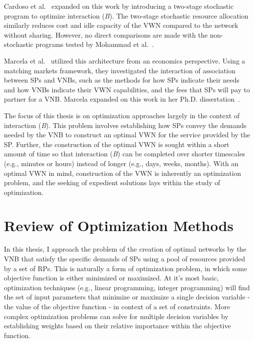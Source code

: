 \documentclass[12pt,dvipsnames]{report}
\begin{document}
Cardoso et al.~\cite{MJ_MECOMM_17} expanded on this work by introducing a two-stage stochastic program to optimize interaction (\emph{B}).  The two-stage stochastic resource allocation similarly reduces cost and idle capacity of the VWN compared to the network without sharing.  However, no direct comparisons are made with the non-stochastic programs tested by Mohammad et al.~\cite{MJ_CCNC_16}.

Marcela et al.~\cite{pittir33631} utilized this architecture from an economics perspective.  Using a matching markets framework, they investigated the interaction of association between SPs and VNBs, such as the methods for how SPs indicate their needs and how VNBs indicate their VWN capabilities, and the fees that SPs will pay to partner for a VNB.  Marcela expanded on this work in her Ph.D. dissertation~\cite{pittir33130}.%

The focus of this thesis is on optimization approaches largely in the context of interaction (\emph{B}).  This problem involves establishing how SPs convey the demands needed by the VNB to construct an optimal VWN for the service provided by the SP.  Further, the construction of the optimal VWN is sought within a short amount of time so that interaction (\emph{B}) can be completed over shorter timescales (e.g., minutes or hours) instead of longer (e.g., days, weeks, months).  With an optimal VWN in mind, construction of the VWN is inherently an optimization problem, and the seeking of expedient solutions lays within the study of optimization.

\section{Review of Optimization Methods} \label{sec:optreview}

%
In this thesis, I approach the problem of the creation of optimal networks by the VNB that satisfy the specific demands of SPs using a pool of resources provided by a set of RPs.  This is naturally a form of optimization problem, in which some objective function is either minimized or maximized.  At it's most basic, optimization techniques (e.g., linear programming, integer programming) will find the set of input parameters that minimize or maximize a single decision variable - the value of the objective function - in context of a set of constraints.  More complex optimization problems can solve for multiple decision variables by establishing weights based on their relative importance within the objective function.
\end{document}

